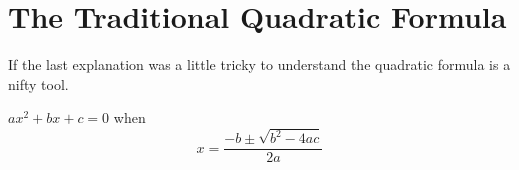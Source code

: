 \section{The Traditional Quadratic Formula}

If the last explanation was a little tricky to understand the quadratic formula is a nifty tool.

\begin{mdframed}[style=important, frametitle={The Quadratic Formula}]

$ax^2 + bx + c = 0$ when
\begin{equation*}
  x = \frac{-b \pm \sqrt{b^2 - 4ac}}{2a}
\end{equation*}

\end{mdframed}
